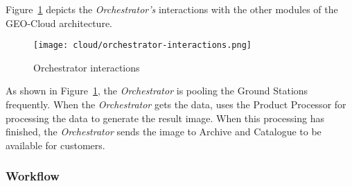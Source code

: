 Figure~\ref{fig:orchestrator-interactions} depicts the \emph{Orchestrator’s} interactions with the other modules of the GEO-Cloud architecture.


\begin{figure}[!h]
\begin{center}
\texttt{[image: cloud/orchestrator-interactions.png]}
\caption{Orchestrator interactions}
\label{fig:orchestrator-interactions}
\end{center}
\end{figure}


As shown in Figure~\ref{fig:orchestrator-interactions}, the \emph{Orchestrator} is
pooling the Ground Stations frequently. When the \emph{Orchestrator} gets the data,
uses the Product Processor for processing the data to generate the result
image. When this processing has finished, the \emph{Orchestrator} sends the image to
Archive and Catalogue to be available for customers.

\subsubsection{Workflow}

